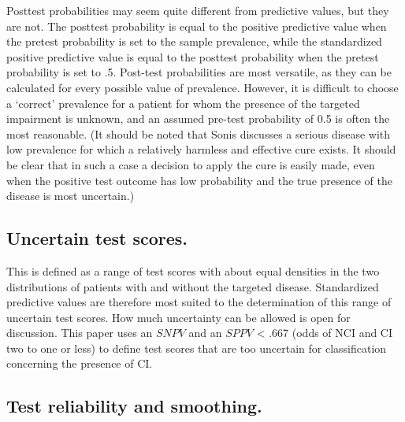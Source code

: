 \documentclass[
  nojss]{jss}
\begin{document}
Posttest probabilities \citep{sonis_how_1999} may seem quite different
from predictive values, but they are not. The posttest probability is
equal to the positive predictive value when the pretest probability is
set to the sample prevalence, while the standardized positive predictive
value is equal to the posttest probability when the pretest probability
is set to .5. Post-test probabilities are most versatile, as they can be
calculated for every possible value of prevalence. However, it is
difficult to choose a `correct' prevalence for a patient for whom the
presence of the targeted impairment is unknown, and an assumed pre-test
probability of 0.5 is often the most reasonable. (It should be noted
that Sonis \citeyearpar{sonis_how_1999} discusses a serious disease with
low prevalence for which a relatively harmless and effective cure
exists. It should be clear that in such a case a decision to apply the
cure is easily made, even when the positive test outcome has low
probability and the true presence of the disease is most uncertain.)

\hypertarget{uncertain-test-scores.}{%
\subsection{Uncertain test scores.}\label{uncertain-test-scores.}}

This is defined as a range of test scores with about equal densities in
the two distributions of patients with and without the targeted disease.
Standardized predictive values are therefore most suited to the
determination of this range of uncertain test scores. How much
uncertainty can be allowed is open for discussion. This paper uses an
\(SNPV\) and an \(SPPV\) \textless{} .667 (odds of NCI and CI two to one
or less) to define test scores that are too uncertain for classification
concerning the presence of CI.

\hypertarget{test-reliability-and-smoothing.}{%
\subsection{Test reliability and
smoothing.}\label{test-reliability-and-smoothing.}}
\end{document}
